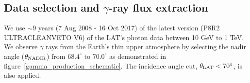\subsection{Data selection and $\gamma$-ray flux extraction}

We use $\sim9$ years (7 Aug 2008 - 16 Oct 2017) of the latest version
(P8R2 ULTRACLEANVETO V6) of the LAT's photon data between 10 GeV to 1 TeV.
We observe $\gamma$ rays from the Earth's thin upper atmosphere by selecting the
nadir angle ($\theta_{\rm NADIR}$) from $68.4^\circ$ to $70.0^\circ$ \cite{previouswork} as
demonstrated in figure~\ref{gamma_production_schematic}. The incidence angle cut,
$\theta_{\rm LAT}<70^\circ$, is also applied.



